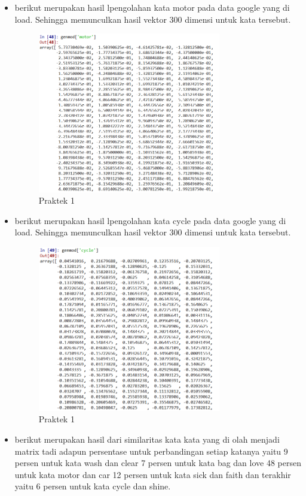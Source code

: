 \begin{enumerate}
\begin{itemize}
\item berikut merupakan hasil lpengolahan kata motor pada data google yang di load. Sehingga memunculkan hasil vektor 300 dimensi untuk kata tersebut.

\begin{figure}[H]
    \includegraphics[width=8cm]{figures/1174084/5/11.png}
    \centering
    \caption{Praktek 1}
\end{figure}

\item berikut merupakan hasil lpengolahan kata cycle pada data google yang di load. Sehingga memunculkan hasil vektor 300 dimensi untuk kata tersebut.

\begin{figure}[H]
    \includegraphics[width=8cm]{figures/1174084/5/12.png}
    \centering
    \caption{Praktek 1}
\end{figure}

\item berikut merupakan hasil dari similaritas kata kata yang di olah menjadi matrix tadi adapun persentase untuk perbandingan setiap katanya yaitu 9 persen untuk kata wash dan clear 7 persen untuk kata bag dan love 48 persen untuk kata motor dan car 12 persen untuk kata sick dan faith dan terakhir yaitu 6 persen untuk kata cycle dan shine.


\end{itemize}
\end{enumerate}

